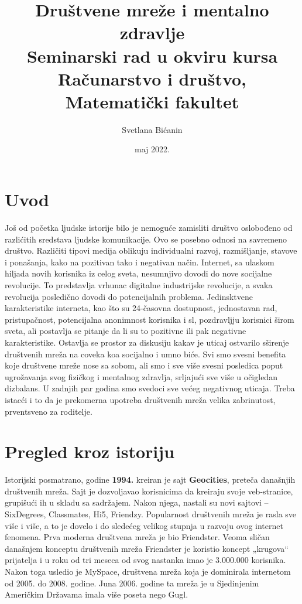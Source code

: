 \documentclass[a4paper]{article}
\begin{document}
	
	\title{Društvene mreže i mentalno zdravlje\\ \small{Seminarski rad u okviru kursa\\Računarstvo i društvo,\\ Matematički fakultet}}
	
	\author{Svetlana Bićanin}
	\date{maj 2022.}
	\maketitle
	
	{
		 		
		\tableofcontents
		
		\newpage
		
		\section{Uvod}
		\label{sec:uvod}
		Još od početka ljudske istorije bilo je nemoguće zamisliti društvo oslobođeno od razlićitih sredstava ljudske komunikacije. Ovo se posebno odnosi na savremeno društvo. Različiti tipovi medija oblikuju individualni razvoj, razmišljanje, stavove i ponašanja, kako na pozitivan tako i negativan način.
		Internet, sa ulaskom hiljada novih korisnika iz celog sveta, nesumnjivo dovodi do nove socijalne revolucije. To predstavlja vrhunac digitalne industrijske revolucije, a svaka revolucija posledično dovodi do potencijalnih problema.
		Jedinsktvene karakteristike interneta, kao što su 24-časovna dostupnost, jednostavan rad, pristupačnost, potencijalna anonimnost korisnika i sl, pozdravljju korisnici širom sveta, ali postavlja se pitanje da li su to pozitivne ili pak negativne karakteristike. Ostavlja se prostor za diskusiju kakav je uticaj ostvarilo sširenje društvenih mreža na coveka koa socijalno i umno biće. Svi smo svesni benefita koje društvene mreže nose sa sobom, ali smo i sve više svesni posledica poput ugrožavanja svog fizičkog i mentalnog zdravlja, srljajući sve više u očigledan dizbalans. U zadnjih par godina smo svedoci sve većeg negativnog uticaja. Treba istacći i to da je prekomerna upotreba društvenih mreža velika zabrinutost, prventsveno za roditelje.
		
		\section{Pregled kroz istoriju}
		Istorijski posmatrano, godine  \textbf{1994.} kreiran je sajt \textbf{Geocities}, preteča današnjih društvenih mreža. Sajt je dozvoljavao korisnicima da kreiraju svoje veb-stranice, grupišući ih u skladu sa sadržajem. Nakon njega, nastali su novi sajtovi – SixDegrees, Classmates, Hi5, Friendzy. Popularnost društvenih mreža je rasla sve više i više, a to je dovelo i do sledećeg velikog stupnja u razvoju ovog internet fenomena. Prva moderna društvena mreža je bio Friendster. Veoma sličan današnjem konceptu društvenih mreža Friendster je koristio koncept „krugova“ prijatelja i u roku
		od tri meseca od svog nastanka imao je 3.000.000 korisnika. Nakon toga usledio je MySpace, društvena mreža koja je dominirala internetom od 2005. do 2008. godine. Juna 2006. godine ta mreža je u Sjedinjenim Američkim Državama imala više poseta nego Gugl.
}
\end{document}
